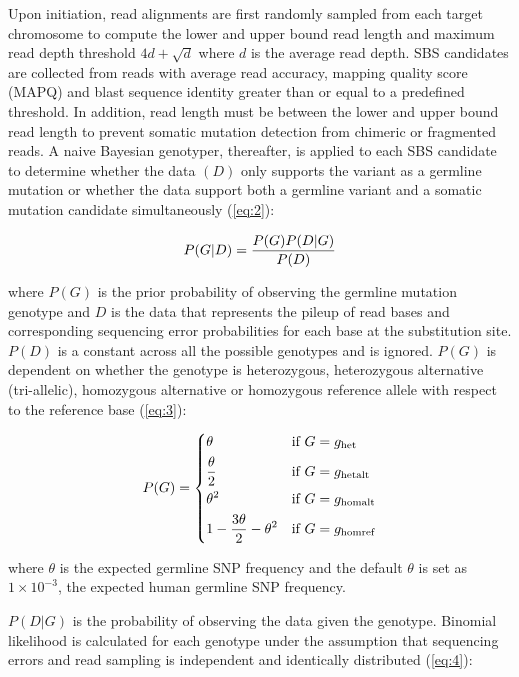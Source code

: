 Upon initiation, read alignments are first randomly sampled from each target chromosome to compute the lower and upper bound read length and maximum read depth threshold $4d + \sqrt{d}$ where $d$ is the average read depth. SBS candidates are collected from reads with average read accuracy, mapping quality score (MAPQ) and blast sequence identity greater than or equal to a predefined threshold. In addition, read length must be between the lower and upper bound read length to prevent somatic mutation detection from chimeric or fragmented reads. A naive Bayesian genotyper, thereafter, is applied to each SBS candidate to determine whether the data $(D)$ only supports the variant as a germline mutation or whether the data support both a germline variant and a somatic mutation candidate simultaneously (\ref{eq:2}):

\begin{equation} \label{eq:2}
P(G|D) = \frac{P(G)P(D|G)}{P(D)} \smallskip
\end{equation}

where $P(G)$ is the prior probability of observing the germline mutation genotype and $D$ is the data that represents the pileup of read bases and corresponding sequencing error probabilities for each base at the substitution site. $P(D)$ is a constant across all the possible genotypes and is ignored. $P(G)$ is dependent on whether the genotype is heterozygous, heterozygous alternative (tri-allelic), homozygous alternative or homozygous reference allele with respect to the reference base (\ref{eq:3}):

\begin{equation} \label{eq:3}
 P(G)= 
 	\begin{dcases}
    	\theta & \text{if } G = g_{\text{het}} \\
	    \frac{\theta}{2} & \text{if } G = g_{\text{hetalt}} \\
		\theta^{2} & \text{if } G = g_{\text{homalt}} \\
		1 - \frac{3\theta}{2} - \theta^{2} & \text{if } G = g_{\text{homref}} \\
	\end{dcases} \smallskip
\end{equation}

where $\theta$ is the expected germline SNP frequency and the default $\theta$ is set as $1\times10^{-3}$, the expected human germline SNP frequency. 

$P(D|G)$ is the probability of observing the data given the genotype. Binomial likelihood is calculated for each genotype under the assumption that sequencing errors and read sampling is independent and identically distributed (\ref{eq:4}):

